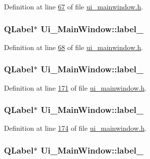 Definition at line \hyperlink{a00139_source_l00067}{67} of file \hyperlink{a00139_source}{ui\+\_\+mainwindow.\+h}.

\hypertarget{a00080_a2e2516d755e4dd53fc905dabddf2738a}{
\subsubsection[{label\+\_\+2}]{\setlength{\rightskip}{0pt plus 5cm}Q\+Label$\ast$ Ui\+\_\+\+Main\+Window\+::label\+\_}}\label{a00080_a2e2516d755e4dd53fc905dabddf2738a}


Definition at line \hyperlink{a00139_source_l00068}{68} of file \hyperlink{a00139_source}{ui\+\_\+mainwindow.\+h}.

\hypertarget{a00080_a0376fd90247280e7c7957cc70628708c}{
\subsubsection[{label\+\_\+3}]{\setlength{\rightskip}{0pt plus 5cm}Q\+Label$\ast$ Ui\+\_\+\+Main\+Window\+::label\+\_}}\label{a00080_a0376fd90247280e7c7957cc70628708c}


Definition at line \hyperlink{a00139_source_l00171}{171} of file \hyperlink{a00139_source}{ui\+\_\+mainwindow.\+h}.

\hypertarget{a00080_a78c7e10730b43c6700cd7216911ed76a}{
\subsubsection[{label\+\_\+4}]{\setlength{\rightskip}{0pt plus 5cm}Q\+Label$\ast$ Ui\+\_\+\+Main\+Window\+::label\+\_}}\label{a00080_a78c7e10730b43c6700cd7216911ed76a}


Definition at line \hyperlink{a00139_source_l00174}{174} of file \hyperlink{a00139_source}{ui\+\_\+mainwindow.\+h}.

\hypertarget{a00080_ad6bab8fb8903b8f41afea1218ee52695}{
\subsubsection[{label\+\_\+5}]{\setlength{\rightskip}{0pt plus 5cm}Q\+Label$\ast$ Ui\+\_\+\+Main\+Window\+::label\+\_}}\label{a00080_ad6bab8fb8903b8f41afea1218ee52695}


